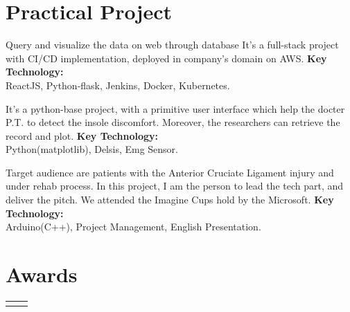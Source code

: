 \documentclass[10pt]{article} %
\begin{document}
\begin{paracol}{2}

\section{Practical Project} 

\longformdescriptionwithremind
{Query and visualize the data on web through database}
{It's a full-stack project with CI/CD implementation, deployed in company's domain on AWS.}
{\textbf{Key Technology:} \\ReactJS, Python-flask, Jenkins, Docker, Kubernetes.}

{It's a python-base project, with a primitive user interface which help the docter P.T. to detect the insole discomfort. Moreover, the researchers can retrieve the record and plot.}
{\textbf{Key Technology:} \\ Python(matplotlib), Delsis, Emg Sensor.}

{Target audience are patients with the Anterior Cruciate Ligament injury and under rehab process. In this project, I am the person to lead the tech part, and deliver the pitch. We attended the Imagine Cups hold by the Microsoft.}
{\textbf{Key Technology:} \\ Arduino(C++), Project Management, English Presentation.}



\section{Awards}
\begin{supertabular}{rl} %
	
	

\end{supertabular}
\end{paracol}
\end{document}
